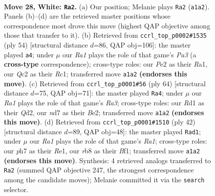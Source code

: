 \documentclass[11pt]{article}
\begin{document}
\clearpage

\begin{figure}[p]\centering
\begin{subfigure}{0.46\textwidth}\centering
\resizebox{\linewidth}{!}{%
\newchessgame
\chessboard[
  setfen={1rb2rk1/p2nb2p/8/2pq4/Pp1p1P2/1P4N1/2Q1PK2/RNBR4 w - - 2 28},
  showmover=false,
  pgfstyle=straightmove, color=movearrow, markmove={a1-a2}
]}
\caption{}
\end{subfigure}\hfill
\begin{subfigure}{0.46\textwidth}\centering
\resizebox{\linewidth}{!}{%
\newchessgame
\chessboard[
  setfen={5rk1/3qnpb1/2r3b1/3p2p1/2pP2P1/P3P1N1/5PBN/R1RQ2K1 w - - 5 28},
  showmover=false,
  pgfstyle=straightmove, color=movearrow, markmove={a3-a4}
]}
\caption{}
\end{subfigure}
\\[4pt]
\begin{subfigure}{0.46\textwidth}\centering
\resizebox{\linewidth}{!}{%
\newchessgame
\chessboard[
  setfen={r3r3/1p3qpk/2p3bp/P1Ppn3/3N4/R5P1/3QBPP1/2R3K1 w - - 9 33},
  showmover=false,
  pgfstyle=straightmove, color=movearrow, markmove={a3-a4}
]}
\caption{}
\end{subfigure}\hfill
\begin{subfigure}{0.46\textwidth}\centering
\resizebox{\linewidth}{!}{%
\newchessgame
\chessboard[
  setfen={3r1rk1/1b1q2p1/pp1pp2p/3n4/3PN3/1Q5P/PP3PP1/R3RBK1 w - - 1 22},
  showmover=false,
  pgfstyle=straightmove, color=movearrow, markmove={a1-d1}
]}
\caption{}
\end{subfigure}
\caption{\textbf{Move 28, White: \texttt{Ra2}.} (a) Our position; Melanie plays \texttt{Ra2} (\texttt{a1a2}). Panels (b)--(d) are the retrieved master positions whose correspondence most drove this move (highest QAP objective among those that transfer to it). (b) Retrieved from \texttt{ccrl\_top\_p0002\#1535} (ply 54) [structural distance $d$=86, QAP obj=106]: the master played \texttt{a4}; under $\mu$ our \emph{Ra1} plays the role of that game's \emph{Pa3} (a \textbf{cross-type} correspondence); cross-type roles: our \emph{P}e2 as their \emph{R}a1, our \emph{Q}c2 as their \emph{R}c1; transferred move \texttt{a1a2} \textbf{(endorses this move)}. (c) Retrieved from \texttt{ccrl\_top\_p0001\#56} (ply 64) [structural distance $d$=75, QAP obj=71]: the master played \texttt{Ra4}; under $\mu$ our \emph{Ra1} plays the role of that game's \emph{Ra3}; cross-type roles: our \emph{R}d1 as their \emph{Q}d2, our \emph{n}d7 as their \emph{B}e2; transferred move \texttt{a1a2} \textbf{(endorses this move)}. (d) Retrieved from \texttt{ccrl\_top\_p0001\#1510} (ply 42) [structural distance $d$=89, QAP obj=48]: the master played \texttt{Rad1}; under $\mu$ our \emph{Ra1} plays the role of that game's \emph{Ra1}; cross-type roles: our \emph{p}h7 as their \emph{R}e1, our \emph{r}b8 as their \emph{B}f1; transferred move \texttt{a1a2} \textbf{(endorses this move)}. Synthesis: 4 retrieved analogs transferred to \texttt{Ra2} (summed QAP objective 247, the strongest correspondence among the candidate moves); Melanie committed it via the \texttt{search} selector.}
\label{fig:thought-m54}
\end{figure}
\end{document}
